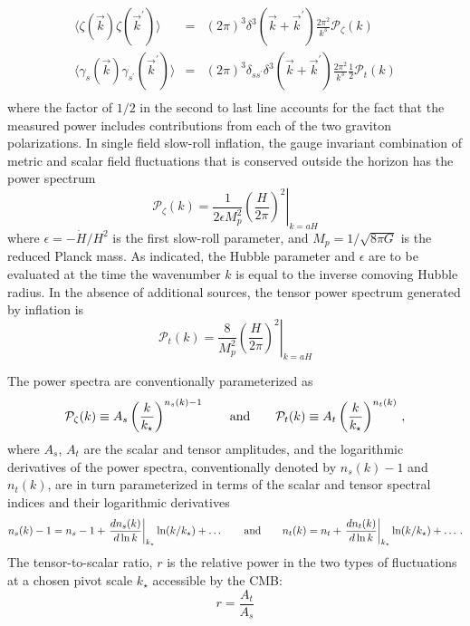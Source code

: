 \begin{eqnarray}
\langle\zeta(\vec{k})\zeta(\vec{k}^{\prime})\rangle&=&(2\pi)^3\delta^3(\vec{k}+\vec{k}^{\prime})\frac{2\pi^2}{k^3}\mathcal{P}_{\zeta}(k)\nonumber\\
\langle\gamma_s(\vec{k})\gamma_{s^{\prime}}(\vec{k}^{\prime})\rangle&=&(2\pi)^3\delta_{ss^{\prime}}\delta^3(\vec{k}+\vec{k}^{\prime})\frac{2\pi^2}{k^3}\frac{1}{2}\mathcal{P}_{t}(k)\nonumber\\
\end{eqnarray}
where the factor of $1/2$ in the second to last line accounts for the fact that the measured power includes contributions from each of the two graviton polarizations. In single field slow-roll inflation, the gauge invariant combination of metric and scalar field fluctuations that is conserved outside the horizon has the power spectrum
\begin{equation}
\label{eq:inf_Pzeta}
\mathcal{P}_{\zeta}(k)=\frac{1}{2\epsilon M_p^2}\left.\left(\frac{H}{2\pi}\right)^2\right|_{k=aH}
\end{equation}
where $\epsilon=-\dot{H}/H^2$ is the first slow-roll parameter, and $M_p=1/\sqrt{8\pi G}$ is the reduced Planck mass. As indicated, the Hubble parameter and $\epsilon$ are to be evaluated at the time the wavenumber $k$ is equal to the inverse comoving Hubble radius. In the absence of additional sources, the tensor power spectrum generated by inflation is
\begin{equation}
\label{eq:inf_Pt}
\mathcal{P}_{t}(k)=\frac{8}{M_p^2}\left.\left(\frac{H}{2\pi}\right)^2\right|_{k=aH}
\end{equation}

The power spectra are conventionally parameterized as
\begin{equation}\label{eq:specind}
\mathcal{P}_{\zeta}(k)\equiv A_s\left(\frac{k}{k_\star}\right)^{n_s(k)-1}\qquad{\rm and}\qquad\mathcal{P}_{t}(k)\equiv A_t \left(\frac{k}{k_\star}\right)^{n_t(k)}\,,
\end{equation}
where $A_s$, $A_t$ are the scalar and tensor amplitudes, and the logarithmic derivatives of the power spectra, conventionally denoted by $n_s(k)-1$ and $n_t(k)$, are in turn parameterized in terms of the scalar and tensor spectral indices and their logarithmic derivatives
\begin{equation}
n_s(k)-1=n_s-1+\left.\frac{dn_s(k)}{d\ln k}\right|_{k_\star}\ln(k/k_\star)+\dots\qquad{\rm and}\qquad n_t(k)=n_t+\left.\frac{dn_t(k)}{d\ln k}\right|_{k_\star}\ln(k/k_\star)+\dots \,.
\end{equation}
The tensor-to-scalar ratio, $r$ is the relative power in the two types of fluctuations at a chosen pivot scale $k_\star$ accessible by the CMB:
\begin{equation}
r=\frac{A_t}{A_s}
\end{equation}


